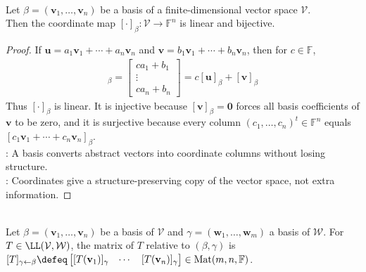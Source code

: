 \begin{proposition} \label{prop:coordinate-map-isomorphism} \\
Let $\beta=(\mathbf{v}_1,\ldots,\mathbf{v}_n)$ be a basis of a finite-dimensional vector space $\mathcal{V}$.\\
Then the coordinate map $[\cdot]_{\beta}:\mathcal{V}\to\mathbb{F}^n$ is linear and bijective.
\begin{proof}
If $\mathbf{u}=a_1\mathbf{v}_1+\cdots+a_n\mathbf{v}_n$ and $\mathbf{v}=b_1\mathbf{v}_1+\cdots+b_n\mathbf{v}_n$, then for $c\in\mathbb{F}$,
\begin{align}
[c\mathbf{u}+\mathbf{v}]_{\beta} =
\begin{bmatrix}
ca_1+b_1\\
\vdots\\
ca_n+b_n
\end{bmatrix}
= c[\mathbf{u}]_{\beta}+[\mathbf{v}]_{\beta} \nonumber
\end{align}
Thus $[\cdot]_{\beta}$ is linear. It is injective because $[\mathbf{v}]_{\beta}=\mathbf{0}$ forces all basis coefficients of $\mathbf{v}$ to be zero, and it is surjective because every column $(c_1,\ldots,c_n)^t\in\mathbb{F}^n$ equals $[c_1\mathbf{v}_1+\cdots+c_n\mathbf{v}_n]_{\beta}$.\\
: A basis converts abstract vectors into coordinate columns without losing structure.\\
: Coordinates give a structure-preserving copy of the vector space, not extra information.
\end{proof}
\end{proposition}

\begin{definition} \\
Let $\beta = (\mathbf{v}_1, \ldots, \mathbf{v}_n)$ be a basis of $\mathcal{V}$ and $\gamma = (\mathbf{w}_1, \ldots, \mathbf{w}_m)$ a basis of $\mathcal{W}$. For $T \in \LL(\mathcal{V}, \mathcal{W})$, the matrix of $T$ relative to $(\beta,\gamma)$ is $[T]_{\gamma \leftarrow \beta} \defeq
\begin{bmatrix}
[T(\mathbf{v}_1)]_{\gamma} & \cdots & [T(\mathbf{v}_n)]_{\gamma}
\end{bmatrix}
\in \operatorname{Mat}(m,n,\mathbb{F})$.
\end{definition}

